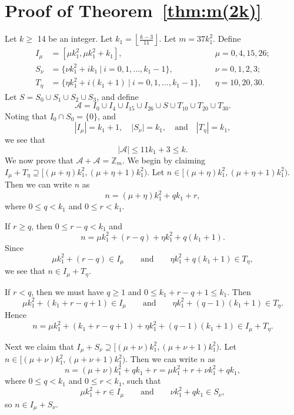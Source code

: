 \documentclass[11pt]{article}
\theoremstyle{definition}
\def\Z{\mbox{$\mathbb Z$}}
\begin{document}
 
 
\section{Proof of Theorem~\ref{thm:m(2k)}}
 

Let $k \geq$ 14 be an integer. Let $\displaystyle k_1 = \left \lfloor \frac{k - 3}{11} \right \rfloor$. Let $m = 37k_1^2$.  Define 
\begin{align*}
I_\mu &= [\mu k_1^2, \mu k_1^2 + k_1],
&&\mu = 0, 4, 15, 26; \\
S_\nu &= \{\nu k_1^2 + ik_1 \ |\  i = 0 , 1, ... , k_1 - 1\},
&&\nu = 0, 1, 2, 3;\\
T_{\eta} &= \{\eta k_1^2+ i(k_1 + 1) \ |\   i = 0 , 1, ... , k_1 -1\},
&&\eta = 10, 20, 30.
\end{align*}
 Let $S= S_{0} \cup S_{1} \cup S_{2} \cup S_{3}$, and
define
\[
\mathscr{A}=I_0\cup I_4\cup I_{15}\cup I_{26}\cup S\cup T_{10}\cup T_{20}\cup T_{30}.
\]
Noting  that $I_0\cap S_0=\{0\}$, and 
\[
|I_\mu| = k_1 + 1,\quad 
|S_\nu| = k_1,\quad\text{and}\quad
|T_\eta| = k_1,
\]
we see that 
\[
|\mathscr{A|} \leq 11k_1 + 3 \leq k.
\]  
We now prove that $\mathscr{A}+\mathscr{A}=\Z_m$.
We begin by claiming $I_{\mu}+T_{\eta}\supseteq[(\mu + \eta )k_1^2 ,  (\mu + \eta  + 1)k_1^2)$. Let $n \in[(\mu + \eta )k_1^2 ,  (\mu + \eta  + 1)k_1^2)$.
Then we can write $n$ as 
\[
n = (\mu + \eta ) k_1^2 + qk_1 + r,
\]
where $0 \leq q < k_1$ and $0 \leq r < k_1$.

If $r \geq q$, then $0\le r-q<k_{1}$ and
\[
n = \mu k_1^2 +  (r - q)+ \eta k_1^2 + q(k_1+1).
\]
 Since 
 \[
 \mu k_1^2 + (r - q) \in I_\mu\qquad\text{and}\qquad \eta k_1^2 +q(k_1+1) \in T_\eta,
 \]
we see that $n \in I_{\mu}+T_{\eta}$. 

If $r < q$, then we must have $q \geq 1$ and $0\le k_{1}+r-q+1\le k_{1}$. Then
\[
\mu k_1^2 + (k_1 + r - q + 1) \in I_\mu \qquad \text{and}\qquad
\eta k_1^2 + (q - 1)(k_1 + 1) \in T_\eta.
\]
 Hence
\[
n = \mu k_1^2 + (k_1 + r - q + 1)+\eta k_1^2 + (q - 1)(k_1 + 1) \in I_{\mu}+T_{\eta}.
\]
 

Next we claim that  $I_{\mu}+S_{\nu}\supseteq[(\mu + \nu )k_1^2 ,  (\mu + \nu  + 1)k_1^2)$. Let $n \in[(\mu + \nu )k_1^2 ,  (\mu + \nu  + 1)k_1^2)$.
Then we can write $n$ as 
\[
n = (\mu + \nu ) k_1^2 + qk_1 + r = \mu k_1^2 + r+\nu k_1^2 + qk_1,
\]
where  $0 \leq q < k_1$ and $0 \leq r < k_1$, such that 
\[
\mu k_1^2 + r \in I_\mu \qquad\text{and}\qquad\nu k_1^2 + qk_1 \in S_\nu,
\]
 so $n \in I_{\mu}+S_{\nu}$. 
\end{document}
